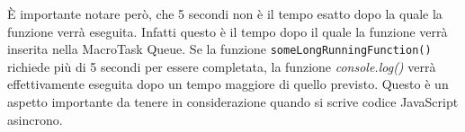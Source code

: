 È importante notare però, che 5 secondi non è il tempo esatto dopo la quale la funzione verrà eseguita. Infatti questo è il tempo dopo il quale la funzione verrà inserita nella MacroTask Queue. Se la funzione \texttt{someLongRunningFunction()} richiede più di 5 secondi per essere completata, la funzione \emph{console.log()} verrà effettivamente eseguita dopo un tempo maggiore di quello previsto. Questo è un aspetto importante da tenere in considerazione quando si scrive codice JavaScript asincrono.